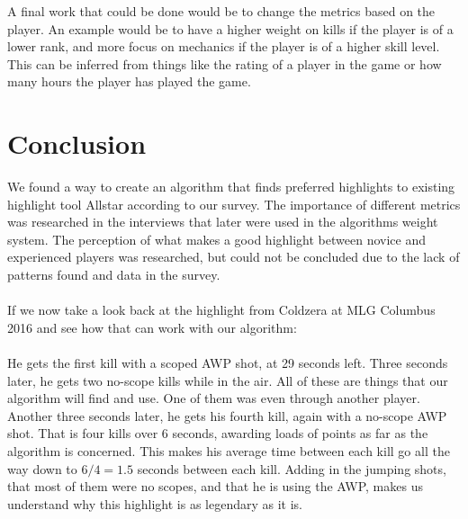 A final work that could be done would be to change the metrics based on the player. An example would be to have a higher weight on kills if the player is of a lower rank, and more focus on mechanics if the player is of a higher skill level. This can be inferred from things like the rating of a player in the game or how many hours the player has played the game.
\section{Conclusion}
We found a way to create an algorithm that finds preferred highlights to existing highlight tool Allstar according to our survey. The importance of different metrics was researched in the interviews that later were used in the algorithms weight system. The perception of what makes a good highlight between novice and experienced players was researched, but could not be concluded due to the lack of patterns found and data in the survey.
\\\\
If we now take a look back at the highlight from Coldzera at MLG Columbus 2016 and see how that can work with our algorithm:
\\\\
He gets the first kill with a scoped AWP shot, at 29 seconds left. Three seconds later, he gets two no-scope kills while in the air. All of these are things that our algorithm will find and use. One of them was even through another player. Another three seconds later, he gets his fourth kill, again with a no-scope AWP shot. That is four kills over 6 seconds, awarding loads of points as far as the algorithm is concerned. This makes his average time between each kill go all the way down to $6/4=1.5$ seconds between each kill. Adding in the jumping shots, that most of them were no scopes, and that he is using the AWP, makes us understand why this highlight is as legendary as it is.


